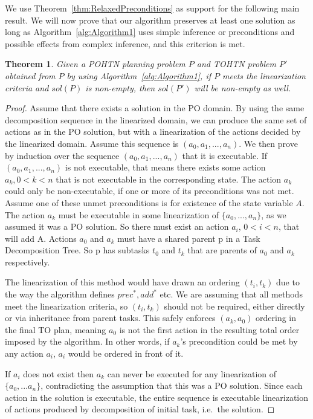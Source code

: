 \documentclass[letterpaper]{article} %
\newtheorem{theorem}{Theorem}
\begin{document}
We use Theorem~\ref{thm:RelaxedPreconditions} as support for the following main result. We will now prove that our algorithm preserves at least one solution as long as Algorithm~\ref{alg:Algorithm1} uses simple inference or preconditions and possible effects from complex inference, and this criterion is met. 

\begin{theorem}\label{thm:SpecialCase}
	Given a POHTN planning problem $P$ and TOHTN problem $P'$ obtained from $P$ by using Algorithm~\ref{alg:Algorithm1}, if $P$ meets the linearization criteria and $sol(P)$ is non-empty, then $sol(P')$ will be non-empty as well.
\end{theorem}
\begin{proof}	
	Assume that there exists a solution in the PO domain. By using the same decomposition sequence in the linearized domain, we can produce the same set of actions as in the PO solution, but with a linearization of the actions decided by the linearized domain. Assume this sequence is $(a_0, a_1, ..., a_n)$. We then prove by induction over the sequence $(a_0, a_1, ..., a_n)$ that it is executable.
	If $(a_0, a_1, ..., a_n)$ is not executable, that means there exists some action $a_k,  0 < k < n$ that is not executable in the corresponding state. The action $a_k$ could only be non-executable, if one or more of its preconditions was not met. Assume one of these unmet preconditions is for existence of the state variable $A$.
	The action $a_k$ must be executable in some linearization of $\{a_0, ..., a_n\}$, as we assumed it was a PO solution. So there must exist an action $a_i$, $0 < i < n$, that will add A. Actions $a_0$ and $a_k$ must have a shared parent p in a Task Decomposition Tree. So p has subtasks $t_0$ and $t_k$ that are parents of $a_0$ and $a_k$ respectively. 
	
	The linearization of this method would have drawn an ordering $(t_i, t_k)$ due to the way the algorithm defines $prec^{*}, add^{*}$ etc. We are assuming that all methods meet the linearization criteria, so $(t_i, t_k)$ should not be required, either directly or via inheritance from parent tasks. This safely enforces $(a_k, a_0)$ ordering in the final TO plan, meaning $a_0$ is not the first action in the resulting total order imposed by the algorithm. In other words, if $a_k$’s precondition could be met by any action $a_i$, $a_i$ would be ordered in front of it. 
	
	If $a_i$ does not exist then $a_k$ can never be executed for any linearization of $\{a_0, ...a_n\}$, contradicting the assumption that this was a PO solution. Since each action in the solution is executable, the entire sequence is executable linearization of actions produced by decomposition of initial task, i.e.\ the solution.
\end{proof}
\end{document}
